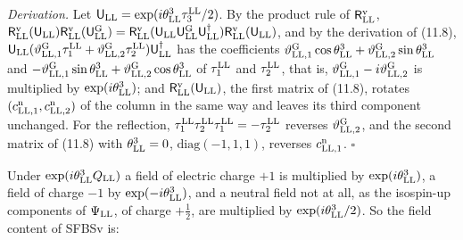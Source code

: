 \documentclass[
  10pt,
]{article}
\begin{document}
\emph{Derivation.} Let
\(\mathsf U_{\rm LL}=\exp(i\theta^3_{\rm LL}\tau^{\rm LL}_3/2)\). By the
product rule of \(\mathsf R^{\rm v}_{\rm LL}\),
\(\mathsf R^{\rm v}_{\rm LL}(\mathsf U_{\rm LL})\mathsf R^{\rm v}_{\rm LL}(\mathsf U^{\rm G}_{\rm LL})=\mathsf R^{\rm v}_{\rm LL}(\mathsf U_{\rm LL}\mathsf U^{\rm G}_{\rm LL}\mathsf U_{\rm LL}^\dagger)\mathsf R^{\rm v}_{\rm LL}(\mathsf U_{\rm LL})\),
and by the derivation of (11.8),
\(\mathsf U_{\rm LL}(\vartheta^{\rm G}_{{\rm LL},1}\tau^{\rm LL}_1+\vartheta^{\rm G}_{{\rm LL},2}\tau^{\rm LL}_2)\mathsf U_{\rm LL}^\dagger\)
has the coefficients
\(\vartheta^{\rm G}_{{\rm LL},1}\cos\theta^3_{\rm LL}+\vartheta^{\rm G}_{{\rm LL},2}\sin\theta^3_{\rm LL}\)
and
\(-\vartheta^{\rm G}_{{\rm LL},1}\sin\theta^3_{\rm LL}+\vartheta^{\rm G}_{{\rm LL},2}\cos\theta^3_{\rm LL}\)
of \(\tau^{\rm LL}_1\) and \(\tau^{\rm LL}_2\), that is,
\(\vartheta^{\rm G}_{{\rm LL},1}-i\vartheta^{\rm G}_{{\rm LL},2}\) is
multiplied by \(\exp(i\theta^3_{\rm LL})\); and
\(\mathsf R^{\rm v}_{\rm LL}(\mathsf U_{\rm LL})\), the first matrix of
(11.8), rotates \((c^{\rm n}_{{\rm LL},1},c^{\rm n}_{{\rm LL},2})\) of
the column in the same way and leaves its third component unchanged. For
the reflection,
\(\tau^{\rm LL}_1\tau^{\rm LL}_2\tau^{\rm LL}_1=-\tau^{\rm LL}_2\)
reverses \(\vartheta^{\rm G}_{{\rm LL},2}\), and the second matrix of
(11.8) with \(\theta^3_{\rm LL}=0\), \(\mathrm{diag}(-1,1,1)\), reverses
\(c^{\rm n}_{{\rm LL},1}\). \(\square\)

Under \(\exp(i\theta^3_{\rm LL}Q_{\rm LL})\) a field of electric charge
\(+1\) is multiplied by \(\exp(i\theta^3_{\rm LL})\), a field of charge
\(-1\) by \(\exp(-i\theta^3_{\rm LL})\), and a neutral field not at all,
as the isospin-up components of \(\Psi_{\rm LL}\), of charge
\(+\tfrac12\), are multiplied by \(\exp(i\theta^3_{\rm LL}/2)\). So the
field content of SFBSv is:
\end{document}
